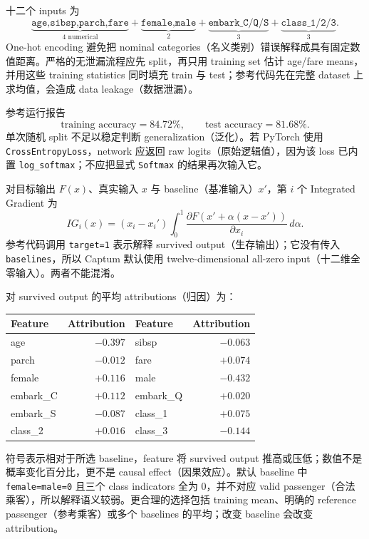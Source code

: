 \begin{checkedsolution}
十二个 inputs 为
\[
  \underbrace{\texttt{age,sibsp,parch,fare}}_{4\text{ numerical}}
  +\underbrace{\texttt{female,male}}_{2}
  +\underbrace{\texttt{embark\_C/Q/S}}_{3}
  +\underbrace{\texttt{class\_1/2/3}}_{3}.
\]
One-hot encoding 避免把 nominal categories（名义类别）错误解释成具有固定数值距离。严格的无泄漏流程应先 split，再只用 training set 估计 age/fare means，并用这些 training statistics 同时填充 train 与 test；参考代码先在完整 dataset 上求均值，会造成 data leakage（数据泄漏）。

参考运行报告
\[
  \text{training accuracy}=84.72\%,\qquad
  \text{test accuracy}=81.68\%.
\]
单次随机 split 不足以稳定判断 generalization（泛化）。若 PyTorch 使用 \texttt{CrossEntropyLoss}，network 应返回 raw logits（原始逻辑值），因为该 loss 已内置 \texttt{log\_softmax}；不应把显式 \texttt{Softmax} 的结果再次输入它。

对目标输出 $F(x)$、真实输入 $x$ 与 baseline（基准输入）$x'$，第 $i$ 个 Integrated Gradient 为
\[
  IG_i(x)=(x_i-x_i')\int_0^1
  \frac{\partial F\!\left(x'+\alpha(x-x')\right)}{\partial x_i}\,d\alpha.
\]
参考代码调用 \texttt{target=1} 表示解释 survived output（生存输出）；它没有传入 \texttt{baselines}，所以 Captum 默认使用 twelve-dimensional all-zero input（十二维全零输入）。两者不能混淆。

对 survived output 的平均 attributions（归因）为：
\begin{center}
\small
\begin{tabular}{@{}lrlr@{}}
  \toprule
  Feature & Attribution & Feature & Attribution \\
  \midrule
  age & $-0.397$ & sibsp & $-0.063$ \\
  parch & $-0.012$ & fare & $+0.074$ \\
  female & $+0.116$ & male & $-0.432$ \\
  embark\_C & $+0.112$ & embark\_Q & $+0.020$ \\
  embark\_S & $-0.087$ & class\_1 & $+0.075$ \\
  class\_2 & $+0.016$ & class\_3 & $-0.144$ \\
  \bottomrule
\end{tabular}
\end{center}
符号表示相对于所选 baseline，feature 将 survived output 推高或压低；数值不是概率变化百分比，更不是 causal effect（因果效应）。默认 baseline 中 \texttt{female=male=0} 且三个 class indicators 全为 0，并不对应 valid passenger（合法乘客），所以解释语义较弱。更合理的选择包括 training mean、明确的 reference passenger（参考乘客）或多个 baselines 的平均；改变 baseline 会改变 attribution。
\end{checkedsolution}

